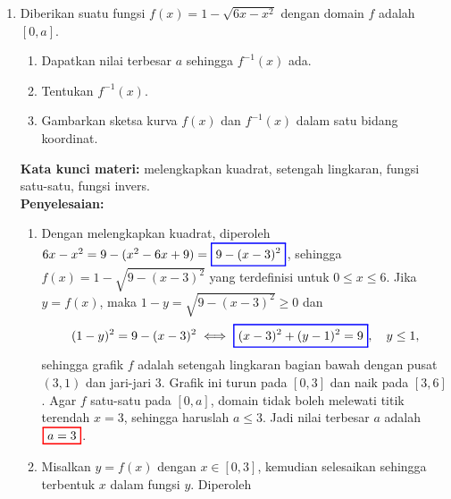\documentclass[10pt,openany,a4paper]{article}
\theoremstyle{definition}
\theoremstyle{definition}
\theoremstyle{plain}
\newenvironment{jawab}[2][tes]{%
\par\noindent\textbf{Kata kunci materi:} #1.\\
\textbf{Penyelesaian:} #2%
}{}
\begin{document}
\begin{enumerate}
\begin{jawab}[domain fungsi, fungsi komposisi, domain fungsi komposisi]
{\begin{enumerate}
            \begin{align*}
                \colorlet{oldcolor}{.}
        \color{red}
        \setlength{\fboxrule}{1pt} \boxed{\color{oldcolor}D(g\circ f) = \{x\in\mathbb{R} : -14<x\leq 2\} = (-14,2]}\color{oldcolor}.
            \end{align*}
            \textit{Catatan:} meskipun bentuk akhir $\frac{1}{\sqrt{14+x}}$ terdefinisi untuk $x>2$, nilai-nilai tersebut tidak termasuk domain karena $f(x)$ tidak terdefinisi di sana.
        \end{enumerate}
    }
    \end{jawab}

    \item Diberikan suatu fungsi $f(x)=1-\sqrt{6x-x^2}$ dengan domain $f$ adalah $[0,a]$.
    \begin{enumerate}
        \item Dapatkan nilai terbesar $a$ sehingga $f^{-1}(x)$ ada.
        \item Tentukan $f^{-1}(x)$.
        \item Gambarkan sketsa kurva $f(x)$ dan $f^{-1}(x)$ dalam satu bidang koordinat.
    \end{enumerate}
    \begin{jawab}[melengkapkan kuadrat, setengah lingkaran, fungsi satu-satu, fungsi invers]{
        \begin{enumerate}
            \item Dengan melengkapkan kuadrat, diperoleh $6x-x^2=9-(x^2-6x+9)=\colorlet{oldcolor}{.}
        \color{blue}
        \setlength{\fboxrule}{1pt} \boxed{\color{oldcolor}9-(x-3)^2}\color{oldcolor}$, sehingga $f(x)=1-\sqrt{9-(x-3)^2}$ yang terdefinisi untuk $0\leq x\leq 6$. Jika $y=f(x)$, maka $1-y=\sqrt{9-(x-3)^2}\geq 0$ dan
            \begin{align*}
                (1-y)^2 = 9-(x-3)^2 \iff \colorlet{oldcolor}{.}
        \color{blue}
        \setlength{\fboxrule}{1pt} \boxed{\color{oldcolor}(x-3)^2+(y-1)^2=9}\color{oldcolor},\quad y\leq 1,
            \end{align*}
            sehingga grafik $f$ adalah setengah lingkaran bagian bawah dengan pusat $(3,1)$ dan jari-jari $3$. Grafik ini turun pada $[0,3]$ dan naik pada $[3,6]$. Agar $f$ satu-satu pada $[0,a]$, domain tidak boleh melewati titik terendah $x=3$, sehingga haruslah $a\leq 3$. Jadi nilai terbesar $a$ adalah $\colorlet{oldcolor}{.}
        \color{red}
        \setlength{\fboxrule}{1pt} \boxed{\color{oldcolor}a=3}\color{oldcolor}$.
            \item Misalkan $y=f(x)$ dengan $x\in[0,3]$, kemudian selesaikan sehingga terbentuk $x$ dalam fungsi $y$. Diperoleh

\end{enumerate}}
\end{jawab}
\end{enumerate}
\end{document}
